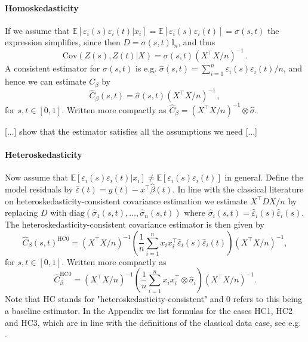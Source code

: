 \paragraph{Homoskedasticity}

If we assume that $\mathbb{E}[\varepsilon_i(s) \varepsilon_i(t) | x_i] =
\mathbb{E}[\varepsilon_i(s) \varepsilon_i(t)] = \sigma(s, t)$ the expression simplifies,
since then $D = \sigma(s, t) \mathbb{I}_n$, and thus
\[
    \text{Cov}(Z(s), Z(t) | X) = \sigma(s, t) (X^\top X / n)^{-1} \,.
\]
A consistent estimator for $\sigma(s, t)$ is e.g. $\hat{\sigma}(s, t) = \sum_{i=1}^n
\varepsilon_i(s) \varepsilon_i(t) / n$, and hence we can estimate $C_\beta$ by
\[
    \hat{C}_\beta(s, t) = \hat{\sigma}(s, t) (X^\top X / n)^{-1} \,,
\]
for $s, t \in [0, 1]$. Written more compactly as $\hat{C}_\beta = (X^\top X / n)^{-1}
\otimes \hat{\sigma}$.

\begin{proposition}{}
    [...] show that the estimator satisfies all the assumptions we need [...]
\end{proposition}

\paragraph{Heteroskedasticity}

Now assume that $\mathbb{E}[\varepsilon_i(s) \varepsilon_i(t) | x_i] \neq
\mathbb{E}[\varepsilon_i(s) \varepsilon_i(t)]$ in general. Define the model residuals by
$\hat{\varepsilon}(t) = y(t) - x^\top \hat{\beta}(t)$. In line with the classical
literature on heteroskedasticity-consistent covariance estimation we estimate $X^\top D
X / n$ by replacing $D$ with $\text{diag}(\hat{\sigma}_1(s, t), \dots, \hat{\sigma}_n(s,
t))$ where $\hat{\sigma}_i(s, t) = \hat{\varepsilon}_i(s) \hat{\varepsilon}_i(s)$. The
heteroskedasticity-consistent covariance estimator is then given by
\[
    \hat{C}_\beta(s, t)^{\text{HC0}} = (X^\top X / n)^{-1} ( \frac{1}{n}
    \sum_{i=1}^n x_i x_i^\top \hat{\varepsilon}_i(s) \hat{\varepsilon}_i(t) )
    (X^\top X / n)^{-1},
\]
for $s, t \in [0, 1]$. Written more compactly as
\[
    \hat{C}_\beta^{\text{HC0}} = (X^\top X / n)^{-1} ( \frac{1}{n} \sum_{i=1}^n x_i
    x_i^\top \otimes \hat{\sigma}_i ) (X^\top X / n)^{-1}.
\]
Note that HC stands for "heteroskedasticity-consistent" and 0 refers to this being a
baseline estimator. In the Appendix we list formulas for the cases HC1, HC2 and HC3,
which are in line with the definitions of the classical data case, see e.g. \cite{HansenEconometricsBook}.

